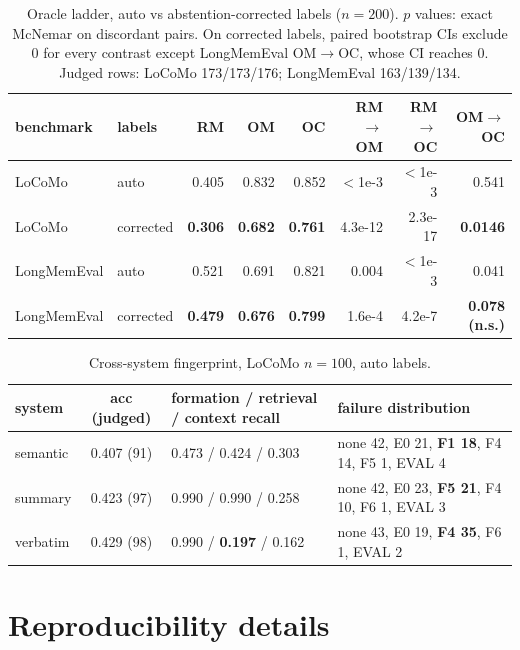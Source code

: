 \documentclass[11pt]{article}
\begin{document}
\begin{table}[t]
\centering
\small
\setlength{\tabcolsep}{4pt}
\begin{tabular}{@{}llrrrrrr@{}}
\toprule
benchmark & labels & RM & OM & OC & RM$\to$OM & RM$\to$OC & OM$\to$OC \\
\midrule
LoCoMo & auto & 0.405 & 0.832 & 0.852 & $<$1e-3 & $<$1e-3 & 0.541 \\
LoCoMo & corrected & \textbf{0.306} & \textbf{0.682} & \textbf{0.761} &
4.3e-12 & 2.3e-17 & \textbf{0.0146} \\
LongMemEval & auto & 0.521 & 0.691 & 0.821 & 0.004 & $<$1e-3 & 0.041 \\
LongMemEval & corrected & \textbf{0.479} & \textbf{0.676} & \textbf{0.799} &
1.6e-4 & 4.2e-7 & \textbf{0.078 (n.s.)} \\
\bottomrule
\end{tabular}
\caption{Oracle ladder, auto vs abstention-corrected labels ($n = 200$).
$p$ values: exact McNemar on discordant pairs. On corrected labels, paired
bootstrap CIs exclude 0 for every contrast except LongMemEval OM$\to$OC, whose
CI reaches 0. Judged rows: LoCoMo 173/173/176; LongMemEval 163/139/134.}
\label{tab:ladder}
\end{table}

\begin{table}[t]
\centering
\small
\begin{tabular}{@{}lcp{3.7cm}p{7.0cm}@{}}
\toprule
system & acc (judged) & formation / retrieval / context recall & failure distribution \\
\midrule
semantic & 0.407 (91) & 0.473 / 0.424 / 0.303 &
none 42, E0 21, \textbf{F1 18}, F4 14, F5 1, EVAL 4 \\
summary & 0.423 (97) & 0.990 / 0.990 / 0.258 &
none 42, E0 23, \textbf{F5 21}, F4 10, F6 1, EVAL 3 \\
verbatim & 0.429 (98) & 0.990 / \textbf{0.197} / 0.162 &
none 43, E0 19, \textbf{F4 35}, F6 1, EVAL 2 \\
\bottomrule
\end{tabular}
\caption{Cross-system fingerprint, LoCoMo $n = 100$, auto labels.}
\label{tab:fingerprint}
\end{table}

\section{Reproducibility details}
\label{app:repro}
\end{document}
